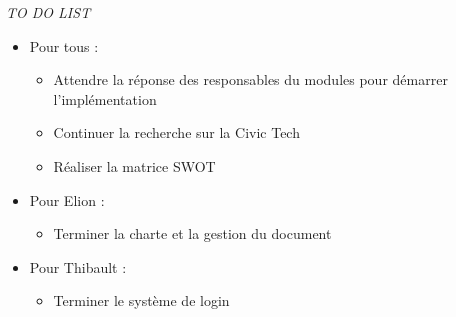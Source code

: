 \vskip 1cm
\noindent
\textit{TO DO LIST}
\vskip 0.25cm

\begin{itemize}
\item Pour tous :
\begin{itemize}
    \item Attendre la réponse des responsables du modules pour démarrer l'implémentation
    \item Continuer la recherche sur la Civic Tech
    \item Réaliser la matrice SWOT
\end{itemize}
\item Pour Elion :
\begin{itemize}
    \item Terminer la charte et la gestion du document
\end{itemize}
\item Pour Thibault :
\begin{itemize}
    \item Terminer le système de login
\end{itemize}
\end{itemize}
